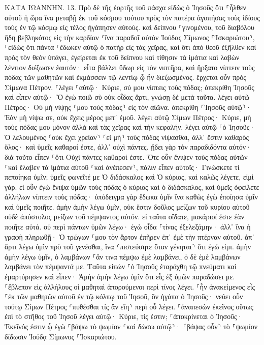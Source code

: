 \documentclass[twoside, 9pt]{extreport}
\begin{document}
ΚΑΤΑ ΙΩΑΝΝΗΝ.
13.
Πρὸ δὲ τῆς ἑορτῆς τοῦ πάσχα εἰδὼς ὁ Ἰησοῦς ὅτι ⸀ἦλθεν αὐτοῦ ἡ ὥρα ἵνα μεταβῇ ἐκ τοῦ κόσμου τούτου πρὸς τὸν πατέρα ἀγαπήσας τοὺς ἰδίους τοὺς ἐν τῷ κόσμῳ εἰς τέλος ἠγάπησεν αὐτούς. 
καὶ δείπνου ⸀γινομένου, τοῦ διαβόλου ἤδη βεβληκότος εἰς τὴν καρδίαν ⸂ἵνα παραδοῖ αὐτὸν Ἰούδας Σίμωνος ⸀Ἰσκαριώτου⸃, 
⸀εἰδὼς ὅτι πάντα ⸀ἔδωκεν αὐτῷ ὁ πατὴρ εἰς τὰς χεῖρας, καὶ ὅτι ἀπὸ θεοῦ ἐξῆλθεν καὶ πρὸς τὸν θεὸν ὑπάγει, 
ἐγείρεται ἐκ τοῦ δείπνου καὶ τίθησιν τὰ ἱμάτια καὶ λαβὼν λέντιον διέζωσεν ἑαυτόν· 
εἶτα βάλλει ὕδωρ εἰς τὸν νιπτῆρα, καὶ ἤρξατο νίπτειν τοὺς πόδας τῶν μαθητῶν καὶ ἐκμάσσειν τῷ λεντίῳ ᾧ ἦν διεζωσμένος. 
ἔρχεται οὖν πρὸς Σίμωνα Πέτρον. ⸀λέγει ⸀αὐτῷ· Κύριε, σύ μου νίπτεις τοὺς πόδας; 
ἀπεκρίθη Ἰησοῦς καὶ εἶπεν αὐτῷ· Ὃ ἐγὼ ποιῶ σὺ οὐκ οἶδας ἄρτι, γνώσῃ δὲ μετὰ ταῦτα. 
λέγει αὐτῷ Πέτρος· Οὐ μὴ νίψῃς ⸂μου τοὺς πόδας⸃ εἰς τὸν αἰῶνα. ἀπεκρίθη ⸂Ἰησοῦς αὐτῷ⸃· Ἐὰν μὴ νίψω σε, οὐκ ἔχεις μέρος μετ᾽ ἐμοῦ. 
λέγει αὐτῷ Σίμων Πέτρος· Κύριε, μὴ τοὺς πόδας μου μόνον ἀλλὰ καὶ τὰς χεῖρας καὶ τὴν κεφαλήν. 
λέγει αὐτῷ ⸀ὁ Ἰησοῦς· Ὁ λελουμένος ⸂οὐκ ἔχει χρείαν⸃ ⸂εἰ μὴ⸃ τοὺς πόδας νίψασθαι, ἀλλ᾽ ἔστιν καθαρὸς ὅλος· καὶ ὑμεῖς καθαροί ἐστε, ἀλλ᾽ οὐχὶ πάντες. 
ᾔδει γὰρ τὸν παραδιδόντα αὐτόν· διὰ τοῦτο εἶπεν ⸀ὅτι Οὐχὶ πάντες καθαροί ἐστε. 
Ὅτε οὖν ἔνιψεν τοὺς πόδας αὐτῶν ⸀καὶ ἔλαβεν τὰ ἱμάτια αὐτοῦ ⸂καὶ ἀνέπεσεν⸃, πάλιν εἶπεν αὐτοῖς· Γινώσκετε τί πεποίηκα ὑμῖν; 
ὑμεῖς φωνεῖτέ με Ὁ διδάσκαλος καὶ Ὁ κύριος, καὶ καλῶς λέγετε, εἰμὶ γάρ. 
εἰ οὖν ἐγὼ ἔνιψα ὑμῶν τοὺς πόδας ὁ κύριος καὶ ὁ διδάσκαλος, καὶ ὑμεῖς ὀφείλετε ἀλλήλων νίπτειν τοὺς πόδας· 
ὑπόδειγμα γὰρ ἔδωκα ὑμῖν ἵνα καθὼς ἐγὼ ἐποίησα ὑμῖν καὶ ὑμεῖς ποιῆτε. 
ἀμὴν ἀμὴν λέγω ὑμῖν, οὐκ ἔστιν δοῦλος μείζων τοῦ κυρίου αὐτοῦ οὐδὲ ἀπόστολος μείζων τοῦ πέμψαντος αὐτόν. 
εἰ ταῦτα οἴδατε, μακάριοί ἐστε ἐὰν ποιῆτε αὐτά. 
οὐ περὶ πάντων ὑμῶν λέγω· ἐγὼ οἶδα ⸀τίνας ἐξελεξάμην· ἀλλ᾽ ἵνα ἡ γραφὴ πληρωθῇ· Ὁ τρώγων ⸀μου τὸν ἄρτον ἐπῆρεν ἐπ᾽ ἐμὲ τὴν πτέρναν αὐτοῦ. 
ἀπ᾽ ἄρτι λέγω ὑμῖν πρὸ τοῦ γενέσθαι, ἵνα ⸂πιστεύσητε ὅταν γένηται⸃ ὅτι ἐγώ εἰμι. 
ἀμὴν ἀμὴν λέγω ὑμῖν, ὁ λαμβάνων ⸀ἄν τινα πέμψω ἐμὲ λαμβάνει, ὁ δὲ ἐμὲ λαμβάνων λαμβάνει τὸν πέμψαντά με. 
Ταῦτα εἰπὼν ⸀ὁ Ἰησοῦς ἐταράχθη τῷ πνεύματι καὶ ἐμαρτύρησεν καὶ εἶπεν· Ἀμὴν ἀμὴν λέγω ὑμῖν ὅτι εἷς ἐξ ὑμῶν παραδώσει με. 
⸀ἔβλεπον εἰς ἀλλήλους οἱ μαθηταὶ ἀπορούμενοι περὶ τίνος λέγει. 
⸀ἦν ἀνακείμενος εἷς ⸀ἐκ τῶν μαθητῶν αὐτοῦ ἐν τῷ κόλπῳ τοῦ Ἰησοῦ, ὃν ἠγάπα ὁ Ἰησοῦς· 
νεύει οὖν τούτῳ Σίμων Πέτρος ⸂πυθέσθαι τίς ἂν εἴη⸃ περὶ οὗ λέγει. 
⸀ἀναπεσὼν ἐκεῖνος οὕτως ἐπὶ τὸ στῆθος τοῦ Ἰησοῦ λέγει αὐτῷ· Κύριε, τίς ἐστιν; 
⸀ἀποκρίνεται ὁ Ἰησοῦς· Ἐκεῖνός ἐστιν ᾧ ἐγὼ ⸀βάψω τὸ ψωμίον ⸂καὶ δώσω αὐτῷ⸃· ⸂βάψας οὖν⸃ τὸ ⸀ψωμίον δίδωσιν Ἰούδᾳ Σίμωνος ⸀Ἰσκαριώτου. 
\end{document}
